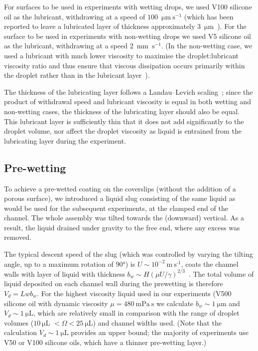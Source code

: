 \begin{subappendices}
For surfaces to be used in experiments with wetting drops, we used V100 silicone oil as the lubricant, withdrawing at a speed of $100$~$\si{\micro}\si{\metre}~\si{\second}^{-1}$ (which has been reported to leave a lubricated layer of thickness approximately $3$~$\si{\micro}\si{\metre}$~\citep{Guan2017SoftMatter}). For the surface to be used in experiments with non-wetting drops we used V5 silicone oil as the lubricant, withdrawing at a speed $2$~mm~$\si{\second}^{-1}$. (In the non-wetting case, we used a lubricant with much lower viscosity to maximise the droplet:lubricant viscosity ratio and thus ensure that viscous dissipation occurs primarily within the droplet rather than in the lubricant layer~\citep{Keiser2017SoftMatter}).

The thickness of the lubricating layer follows a Landau--Levich scaling~\citep{Landau1942, Guan2017SoftMatter}; since the product of withdrawal speed and lubricant viscosity is equal in both wetting and non-wetting cases, the thickness of the lubricating layer should also be equal. This lubricant layer is sufficiently thin that it does not add significantly to the droplet volume, nor affect the droplet viscosity as liquid is entrained from the lubricating layer during the experiment.

\subsection{Pre-wetting}
To achieve a pre-wetted coating on the coverslips (without the addition of a porous surface), we introduced a liquid slug consisting of the same liquid as would be used for the subsequent experiments, at the clamped end of the channel. The whole assembly was tilted towards the (downward) vertical. As a result, the liquid drained under gravity to the free end, where any excess was removed.

The typical descent speed of the slug (which was controlled by varying the tilting angle, up to a maximum rotation of 90$\si{\degree}$) is $U \sim 10^{-2}~\text{m}~\text{s}^{\text{-1}}$, coats the channel walls with  layer of liquid with thickness $b_w \sim H (\mu U/\gamma)^{2/3}$~\citep{Landau1942}. The total volume of liquid deposited on each channel wall during the prewetting is therefore $V_{d} = Lwb_w$. For the highest viscosity liquid used in our experiments (V500 silicone oil with dynamic viscosity $\mu = 480~\si{\milli \pascal~\second}$ we calculate $b_w \sim 1~\si{\micro \metre}$ and $V_d \sim 1~\si{\micro \liter}$, which are relatively small in comparison with the range of droplet volumes ($10~\si{\micro \liter}$  $<\Omega <  25~\si{\micro \liter}$) and channel widths used. (Note that the calculation  $V_d \sim 1~\si{\micro \liter} $ provides an upper bound; the majority of experiments use V50 or V100 silicone oils, which have a  thinner pre-wetting layer.)



\end{subappendices}
